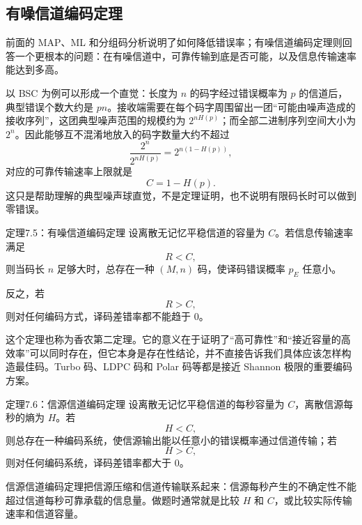 \subsection{有噪信道编码定理}

前面的 MAP、ML 和分组码分析说明了如何降低错误率；有噪信道编码定理则回答一个更根本的问题：在有噪信道中，可靠传输到底是否可能，以及信息传输速率能达到多高。

以 BSC 为例可以形成一个直觉：长度为 $n$ 的码字经过错误概率为 $p$ 的信道后，典型错误个数大约是 $pn$。接收端需要在每个码字周围留出一团“可能由噪声造成的接收序列”，这团典型噪声范围的规模约为 $2^{nH(p)}$；而全部二进制序列空间大小为 $2^n$。因此能够互不混淆地放入的码字数量大约不超过
\[
\frac{2^n}{2^{nH(p)}}=2^{n(1-H(p))},
\]
对应的可靠传输速率上限就是
\[
C=1-H(p).
\]
这只是帮助理解的典型噪声球直觉，不是定理证明，也不说明有限码长时可以做到零错误。

\begin{theoremBox}{定理7.5：有噪信道编码定理}
设离散无记忆平稳信道的容量为 $C$。若信息传输速率满足
\[
R<C,
\]
则当码长 $n$ 足够大时，总存在一种 $(M,n)$ 码，使译码错误概率 $p_E$ 任意小。

反之，若
\[
R>C,
\]
则对任何编码方式，译码差错率都不能趋于 $0$。
\end{theoremBox}

这个定理也称为香农第二定理。它的意义在于证明了“高可靠性”和“接近容量的高效率”可以同时存在，但它本身是存在性结论，并不直接告诉我们具体应该怎样构造最佳码。Turbo 码、LDPC 码和 Polar 码等都是接近 Shannon 极限的重要编码方案。

\begin{theoremBox}{定理7.6：信源信道编码定理}
设离散无记忆平稳信道的每秒容量为 $C$，离散信源每秒的熵为 $H$。若
\[
H<C,
\]
则总存在一种编码系统，使信源输出能以任意小的错误概率通过信道传输；若
\[
H>C,
\]
则对任何编码系统，译码差错率都大于 $0$。
\end{theoremBox}

信源信道编码定理把信源压缩和信道传输联系起来：信源每秒产生的不确定性不能超过信道每秒可靠承载的信息量。做题时通常就是比较 $H$ 和 $C$，或比较实际传输速率和信道容量。

